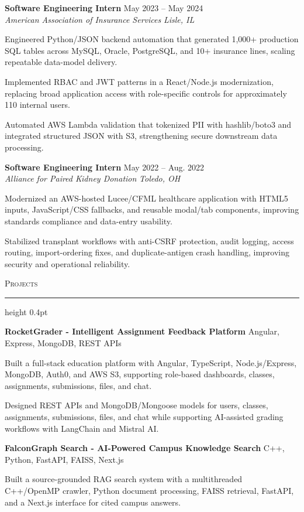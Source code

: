 \documentclass[letterpaper,11pt]{article}
\newcommand{\resumesection}[1]{%
  \par\vspace{2pt}%
  {\large\scshape #1}\par\vspace{2pt}%
  \hrule height 0.4pt\vspace{2pt}%
}
\newcommand{\resumeSubheading}[4]{
  \textbf{#1} \hfill #2\\
  \textit{#3} \hfill \textit{#4}
}
\newcommand{\projectHeading}[2]{
  \textbf{#1} \hfill #2
}
\begin{document}
\resumeSubheading
{Software Engineering Intern}{May 2023 -- May 2024}
{American Association of Insurance Services}{Lisle, IL}
\begin{tightitemize}
  \item Engineered Python/JSON backend automation that generated 1,000+ production SQL tables across MySQL, Oracle, PostgreSQL, and 10+ insurance lines, scaling repeatable data-model delivery.
  \item Implemented RBAC and JWT patterns in a React/Node.js modernization, replacing broad application access with role-specific controls for approximately 110 internal users.
  \item Automated AWS Lambda validation that tokenized PII with hashlib/boto3 and integrated structured JSON with S3, strengthening secure downstream data processing.
\end{tightitemize}

\resumeSubheading
{Software Engineering Intern}{May 2022 -- Aug. 2022}
{Alliance for Paired Kidney Donation}{Toledo, OH}
\begin{tightitemize}
  \item Modernized an AWS-hosted Lucee/CFML healthcare application with HTML5 inputs, JavaScript/CSS fallbacks, and reusable modal/tab components, improving standards compliance and data-entry usability.
  \item Stabilized transplant workflows with anti-CSRF protection, audit logging, access routing, import-ordering fixes, and duplicate-antigen crash handling, improving security and operational reliability.
\end{tightitemize}

\resumesection{Projects}
\projectHeading{RocketGrader - Intelligent Assignment Feedback Platform}{Angular, Express, MongoDB, REST APIs}
\begin{tightitemize}
  \item Built a full-stack education platform with Angular, TypeScript, Node.js/Express, MongoDB, Auth0, and AWS S3, supporting role-based dashboards, classes, assignments, submissions, files, and chat.
  \item Designed REST APIs and MongoDB/Mongoose models for users, classes, assignments, submissions, files, and chat while supporting AI-assisted grading workflows with LangChain and Mistral AI.
\end{tightitemize}

\projectHeading{FalconGraph Search - AI-Powered Campus Knowledge Search}{C++, Python, FastAPI, FAISS, Next.js}
\begin{tightitemize}
  \item Built a source-grounded RAG search system with a multithreaded C++/OpenMP crawler, Python document processing, FAISS retrieval, FastAPI, and a Next.js interface for cited campus answers.
\end{tightitemize}
\end{document}
